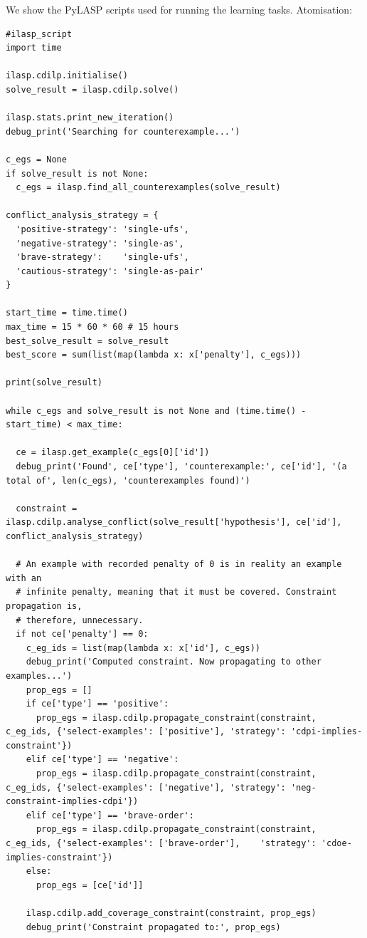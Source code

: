 We show the PyLASP scripts used for running the learning tasks.
Atomisation:
\begin{lstlisting}
#ilasp_script
import time

ilasp.cdilp.initialise()
solve_result = ilasp.cdilp.solve()

ilasp.stats.print_new_iteration()
debug_print('Searching for counterexample...')

c_egs = None
if solve_result is not None:
  c_egs = ilasp.find_all_counterexamples(solve_result)

conflict_analysis_strategy = {
  'positive-strategy': 'single-ufs',
  'negative-strategy': 'single-as',
  'brave-strategy':    'single-ufs',
  'cautious-strategy': 'single-as-pair'
}

start_time = time.time()
max_time = 15 * 60 * 60 # 15 hours
best_solve_result = solve_result
best_score = sum(list(map(lambda x: x['penalty'], c_egs)))

print(solve_result)

while c_egs and solve_result is not None and (time.time() - start_time) < max_time:
    
  ce = ilasp.get_example(c_egs[0]['id'])
  debug_print('Found', ce['type'], 'counterexample:', ce['id'], '(a total of', len(c_egs), 'counterexamples found)')

  constraint = ilasp.cdilp.analyse_conflict(solve_result['hypothesis'], ce['id'], conflict_analysis_strategy)

  # An example with recorded penalty of 0 is in reality an example with an
  # infinite penalty, meaning that it must be covered. Constraint propagation is,
  # therefore, unnecessary.
  if not ce['penalty'] == 0:
    c_eg_ids = list(map(lambda x: x['id'], c_egs))
    debug_print('Computed constraint. Now propagating to other examples...')
    prop_egs = []
    if ce['type'] == 'positive':
      prop_egs = ilasp.cdilp.propagate_constraint(constraint, c_eg_ids, {'select-examples': ['positive'], 'strategy': 'cdpi-implies-constraint'})
    elif ce['type'] == 'negative':
      prop_egs = ilasp.cdilp.propagate_constraint(constraint, c_eg_ids, {'select-examples': ['negative'], 'strategy': 'neg-constraint-implies-cdpi'})
    elif ce['type'] == 'brave-order':
      prop_egs = ilasp.cdilp.propagate_constraint(constraint, c_eg_ids, {'select-examples': ['brave-order'],    'strategy': 'cdoe-implies-constraint'})
    else:
      prop_egs = [ce['id']]

    ilasp.cdilp.add_coverage_constraint(constraint, prop_egs)
    debug_print('Constraint propagated to:', prop_egs)


\end{lstlisting}
